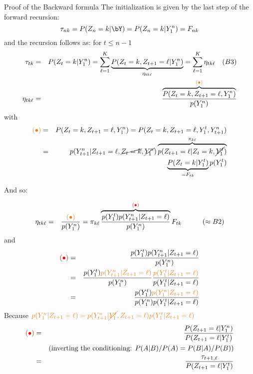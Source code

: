 \documentclass[compress,10pt]{beamer}
\begin{document}
\begin{frame}[allowframebreaks]{Proof of the Backward formula}
 The initialization is given by the last step of the forward recursion:
  $$
  {\tau_{nk}} = P(Z_n =k|\bY) = P(Z_n =k|Y_1^n) = {F_{nk}}
  $$
  and the recursion follows as: for $t \leq n-1$
  \begin{eqnarray*} 
    {\tau_{tk}} & = & P(Z_t = k| Y_1^n) = \sum_{\ell=1}^K \underset{\eta_{tk\ell}}{\underbrace{P(Z_t = k, Z_{t+1} = \ell | Y_1^n)}}  = \sum_{\ell=1}^K \eta_{tk\ell} \quad (B3) \\
   \eta_{tk\ell} & = &  \frac{\overbrace{P(Z_t = k, Z_{t+1} = \ell, Y_1^n)}^{\textcolor{dgreen}{(\bullet)}} }{p(Y_1^n)}
\end{eqnarray*}
with 
 \begin{eqnarray*} 
\textcolor{dgreen}{(\bullet)} &=&P(Z_t = k, Z_{t+1} = \ell, Y_1^n)=  P(Z_t = k, Z_{t+1} = \ell, Y_1^t, Y_{t+1}^n) \\
&=&  p(Y_{t+1}^n|Z_{t+1} = \ell, \cancel{Z_{t} = k},  \cancel{Y_{1}^n}) \overbrace{p(Z_{t+1} = \ell| Z_{t} = k,  \cancel{Y_{1}^t})}^{\pi_{k\ell}}\\
&& \underbrace{P(Z_{t} = k |  Y_{1}^t)}_{=F_{tk}}  p(Y_{1}^t)
 \end{eqnarray*}

And so: 

 \begin{eqnarray*} 
 \eta_{tk\ell}  &=& \frac{\textcolor{dgreen}{(\bullet)}}{p(Y_1^n)} =      \pi_{k\ell}  \overbrace{ \frac{p(Y_1^t) p(Y_{t+1}^n|Z_{t+1} = \ell)}{p(Y_1^n)}}^{\textcolor{red}{(\bullet)}}{F_{tk}}  \quad \quad  \quad (\approx B2)
  \end{eqnarray*}
  and %
  \begin{eqnarray*} 
 \textcolor{red}{(\bullet)} &=&  \frac{p(Y_1^t) p(Y_{t+1}^n|Z_{t+1} = \ell)}{p(Y_1^n)}\\
    & = & \frac{p(Y_1^t) \textcolor{dgreen}{p(Y_{t+1}^n|Z_{t+1} = \ell)}}{p(Y_1^n)} \frac{ \textcolor{dgreen}{p(Y_1^t|Z_{t+1} = \ell)}}{p(Y_1^t|Z_{t+1} = \ell)}\\
  &=&  \frac{p(Y_1^t) \textcolor{dgreen}{p(Y_1^n|Z_{t+1} = \ell)}}{p(Y_1^n) p(Y_1^t|Z_{t+1} = \ell)}
 \end{eqnarray*}
Because  
$\textcolor{dgreen}{p(Y_{1}^n|Z_{t+1} = \ell) =  p(Y_{t+1}^n|\cancel{Y_{1}^t},Z_{t+1} = \ell)p(Y_{1}^t|Z_{t+1}=\ell)}$ 
   \begin{eqnarray*} 
 \textcolor{red}{(\bullet)} & = & \frac{P(Z_{t+1} = \ell|Y_1^n)}{P(Z_{t+1} = \ell|Y_1^t)} \\
  & & \text{(inverting the conditioning: $P(A|B)/P(A) = P(B|A)/P(B)$)} \\
  & = & \frac{\tau_{t+1,\ell}}{P(Z_{t+1} = \ell|Y_1^t)} 
 \end{eqnarray*}
 

\end{frame}
\end{document}
